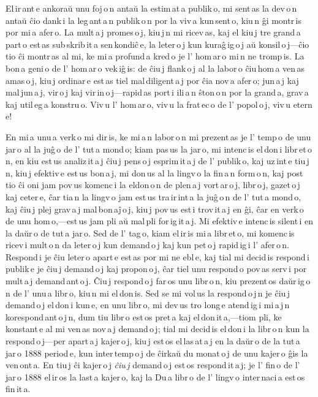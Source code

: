 \fancyhead[C]{--- \thepage{} ---}

\sectionline

El\,ir\,ant\,e ankoraŭ unu foj\,o\,n antaŭ la estim\,at\,a publik\,o, mi sent\,as la dev\,o\,n antaŭ ĉio dank\,i la leg\,ant\,a\,n publik\,o\,n por la viv\,a kun\,sent\,o, kiu\,n ĝi montr\,is por mi\,a afer\,o. La mult\,a\,j promes\,o\,j, kiu\,j\,n mi ricev\,as, kaj el kiu\,j tre grand\,a part\,o est\,as sub\,skrib\,it\,a \glqq{}sen\,kondiĉ\,e\grqq{}, la leter\,o\,j kun kuraĝ\,ig\,o\,j aŭ konsil\,o\,j---ĉio tio ĉi montr\,as al mi, ke mi\,a profund\,a kred\,o je l' hom\,ar\,o mi\,n ne tromp\,is. La bon\,a geni\,o de l' hom\,ar\,o vek\,iĝ\,is: de ĉiu\,j flank\,o\,j al la labor\,o ĉiu\,hom\,a ven\,as amas\,o\,j, kiu\,j ordinar\,e est\,as tiel mal\,diligent\,a\,j por ĉia nov\,a afer\,o; jun\,a\,j kaj mal\,jun\,a\,j, vir\,o\,j kaj vir\,in\,o\,j---rapid\,as port\,i ili\,a\,n ŝton\,o\,n por la grand\,a, grav\,a kaj util\,eg\,a konstru\,o. Viv\,u l' hom\,ar\,o, viv\,u la frat\,ec\,o de l' popol\,o\,j, viv\,u etern\,e!

En mi\,a unu\,a verk\,o mi dir\,is, ke mi\,a\,n labor\,o\,n mi prezent\,as je l' temp\,o de unu jar\,o al la juĝ\,o de l' tut\,a mond\,o; kiam pas\,us la jar\,o, mi intenc\,is el\,don\,i libr\,et\,o\,n, en kiu est\,us analiz\,it\,a\,j ĉiu\,j pens\,o\,j esprim\,it\,a\,j de l' publik\,o, kaj uz\,int\,e tiu\,j\,n, kiu\,j efektiv\,e est\,us bon\,a\,j, mi don\,us al la lingv\,o la fin\,a\,n form\,o\,n, kaj post tio ĉi oni jam pov\,us komenc\,i la eldon\,o\,n de plen\,a\,j vort\,ar\,o\,j, libr\,o\,j, gazet\,o\,j kaj ceter\,e, ĉar tia\,n la lingv\,o jam est\,us tra\,ir\,int\,a la juĝ\,o\,n de l' tut\,a mond\,o, kaj ĉiu\,j plej grav\,a\,j mal\,bon\,aĵ\,o\,j, kiu\,j pov\,us est\,i trov\,it\,a\,j en ĝi, ĉar en verk\,o de unu hom\,o,---est\,us jam pli aŭ mal\,pli for\,ig\,it\,a\,j. Mi efektiv\,e intenc\,is silent\,i en la daŭr\,o de tut\,a jar\,o. Sed de l' tag\,o, kiam el\,ir\,is mi\,a libr\,et\,o, mi komenc\,is ricev\,i mult\,o\,n da leter\,o\,j kun demand\,o\,j kaj kun pet\,o\,j rapid\,ig\,i l' afer\,o\,n. Respond\,i je ĉiu leter\,o apart\,e est\,as por mi ne ebl\,e, kaj tial mi decid\,is respond\,i publik\,e je ĉiu\,j demand\,o\,j kaj propon\,o\,j, ĉar tiel unu respond\,o pov\,as serv\,i por mult\,a\,j demand\,ant\,o\,j. Ĉiu\,j respond\,o\,j far\,os unu libr\,o\,n, kiu prezent\,os daŭr\,ig\,o\,n de l' unu\,a libr\,o, kiu\,n mi el\,don\,is. Sed se mi vol\,us la respond\,o\,j\,n je ĉiu\,j demand\,o\,j el\,don\,i kun\,e, en unu libr\,o, mi dev\,us tro long\,e atend\,ig\,i mi\,a\,j\,n korespond\,ant\,o\,j\,n, dum tiu libr\,o est\,os pret\,a kaj el\,don\,it\,a,---tiom pli, ke konstant\,e al mi ven\,as nov\,a\,j demand\,o\,j; tial mi decid\,is el\,don\,i la libr\,o\,n kun la respond\,o\,j---per apart\,a\,j kajer\,o\,j, kiu\,j est\,os el\,las\,at\,a\,j en la daŭr\,o de la tut\,a jar\,o 1888 period\,e, kun inter\,temp\,o\,j de ĉirkaŭ du monat\,o\,j de unu kajer\,o ĝis la ven\,ont\,a. En tiu\,j ĉi kajer\,o\,j \emph{ĉiu\,j} demand\,o\,j est\,os respond\,it\,a\,j; je l' fin\,o de l' jar\,o 1888 el\,ir\,os la last\,a kajer\,o, kaj la \glqq{}Du\,a libr\,o de l' lingv\,o inter\,naci\,a\grqq{} est\,os fin\,it\,a.

